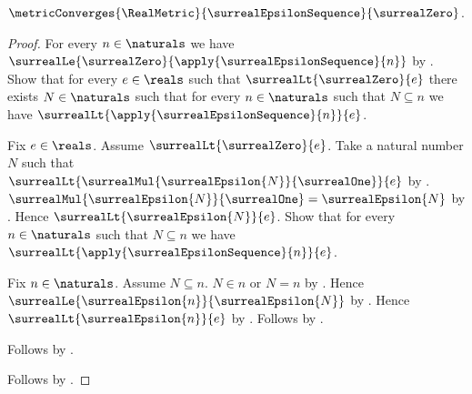 \begin{proposition}\label{surreal_epsilon_sequence_converges_zero}
    $\metricConverges{\RealMetric}{\surrealEpsilonSequence}{\surrealZero}$.
\end{proposition}
\begin{proof}
    For every $n\in\naturals$ we have
        $\surrealLe{\surrealZero}{\apply{\surrealEpsilonSequence}{n}}$
        by
        .
    Show that for every $e\in\reals$ such that
        $\surrealLt{\surrealZero}{e}$ there exists $N\in\naturals$
        such that for every $n\in\naturals$ such that $N\subseteq n$
            we have $\surrealLt{\apply{\surrealEpsilonSequence}{n}}{e}$.
    \begin{subproof}
        Fix $e\in\reals$.
        Assume $\surrealLt{\surrealZero}{e}$.
        Take a natural number $N$ such that
            $\surrealLt{
                \surrealMul{\surrealEpsilon{N}}{\surrealOne}}{e}$
            by
            .
        $\surrealMul{\surrealEpsilon{N}}{\surrealOne}
            =\surrealEpsilon{N}$
            by
            .
        Hence $\surrealLt{\surrealEpsilon{N}}{e}$.
        Show that for every $n\in\naturals$ such that $N\subseteq n$
            we have $\surrealLt{\apply{\surrealEpsilonSequence}{n}}{e}$.
        \begin{subproof}
            Fix $n\in\naturals$.
            Assume $N\subseteq n$.
            $N\in n$ or $N=n$
                by
                .
            Hence $\surrealLe{\surrealEpsilon{n}}{\surrealEpsilon{N}}$
                by
                .
            Hence $\surrealLt{\surrealEpsilon{n}}{e}$
                by
                .
            Follows by .
        \end{subproof}
        Follows by \auto.
    \end{subproof}
    Follows by
        .
\end{proof}

